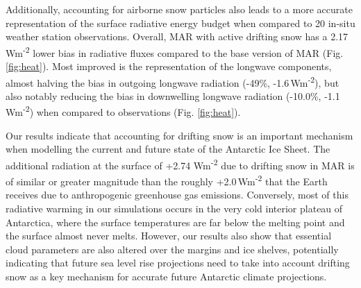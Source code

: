 \documentclass[draft]{agujournal2019}
\begin{document}
Additionally, accounting for airborne snow particles also leads to a more accurate representation of the surface radiative energy budget when compared to 20 in-situ weather station observations. Overall, MAR with active drifting snow has a 2.17\,Wm\textsuperscript{-2} lower bias in radiative fluxes compared to the base version of MAR (Fig. \ref{fig:heat}). Most improved is the representation of the longwave components, almost halving the bias in outgoing longwave radiation (-49\%, -1.6\,Wm\textsuperscript{-2}), but also notably reducing the bias in downwelling longwave radiation (-10.0\%, -1.1\,Wm\textsuperscript{-2}) when compared to observations (Fig. \ref{fig:heat}).

Our results indicate that accounting for drifting snow is an important mechanism when modelling the current and future state of the Antarctic Ice Sheet. The additional radiation at the surface of +2.74 Wm\textsuperscript{-2} due to drifting snow in MAR is of similar or greater magnitude than the roughly +2.0\,Wm\textsuperscript{-2} that the Earth receives due to anthropogenic greenhouse gas emissions. Conversely, most of this radiative warming in our simulations occurs in the very cold interior plateau of Antarctica, where the surface temperatures are far below the melting point and the surface almost never melts. However, our results also show that essential cloud parameters are also altered over the margins and ice shelves, potentially indicating that future sea level rise projections need to take into account drifting snow as a key mechanism for accurate future Antarctic climate projections.

\end{document}
